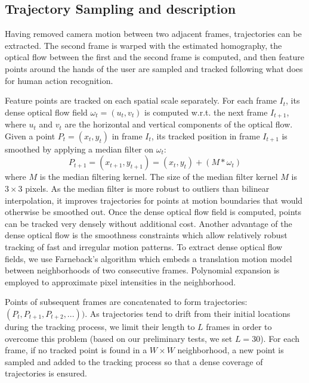 \subsection{Trajectory Sampling and description}
\label{trajectory-descr}
Having removed camera motion between two adjacent frames, trajectories can be extracted. The second frame is warped with the estimated homography, the optical flow between the first and the second frame is computed, and then feature points around the hands of the user are sampled and tracked following what \cite{wang:2011:inria-00583818:1} does for human action recognition.

Feature points are tracked on each spatial scale separately. For each frame $I_t$, its dense optical flow field
$\omega_t = (u_t, v_t)$ is computed w.r.t. the next frame $I_{t+1}$, where $u_t$ and $v_t$ are the horizontal and vertical
components of the optical flow. Given a point $P_t = (x_t, y_t)$ in frame $I_t$, its tracked position in frame $I_{t+1}$
is smoothed by applying a median filter on $\omega_t$:
\begin{equation}
P_{t+1} = (x_{t+1}, y_{t+1}) = (x_t, y_t) + (M * \omega_t)
\end{equation}
where $M$ is the median filtering kernel. The size of the median filter kernel $M$ is $3 \times 3$ pixels. As the
median filter is more robust to outliers than bilinear interpolation, it improves trajectories
for points at motion boundaries that would otherwise be smoothed out.
Once the dense optical flow field is computed, points can be tracked very densely without additional
cost. Another advantage of the dense optical flow is the smoothness constraints which allow relatively
robust tracking of fast and irregular motion patterns. To extract dense optical flow fields, we
use Farneback's algorithm \cite{farneback2003two} which embeds a translation motion model between neighborhoods of two consecutive
frames. Polynomial expansion is employed to approximate pixel intensities in the neighborhood.

Points of subsequent frames are concatenated to form trajectories: $(P_t,  P_{t+1}, P_{t+2}, ...))$. As trajectories
tend to drift from their initial locations during the tracking process, we limit their length to $L$ frames
in order to overcome this problem (based on our preliminary tests, we set $L=30$). For each frame, if no tracked point is found
in a $W \times W$ neighborhood, a new point is sampled and added to the tracking process so that a dense coverage
of trajectories is ensured.

